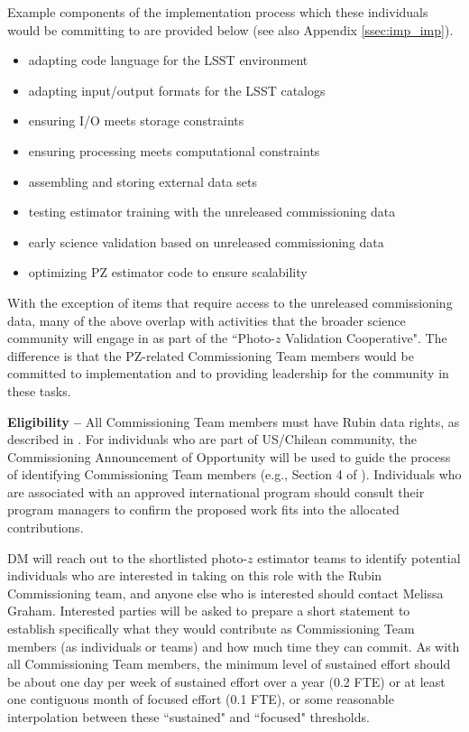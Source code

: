 \documentclass[DM,authoryear,toc]{lsstdoc}
\begin{document}
Example components of the implementation process which these individuals would be committing to are provided below (see also Appendix \ref{ssec:imp_imp}).

\begin{itemize}
\item adapting code language for the LSST environment
\item adapting input/output formats for the LSST catalogs
\item ensuring I/O meets storage constraints
\item ensuring processing meets computational constraints
\item assembling and storing external data sets
\item testing estimator training with the unreleased commissioning data
\item early science validation based on unreleased commissioning data
\item optimizing PZ estimator code to ensure scalability
\end{itemize}

With the exception of items that require access to the unreleased commissioning data, many of the above overlap with activities that the broader science community will engage in as part of the ``Photo-$z$ Validation Cooperative".
The difference is that the PZ-related Commissioning Team members would be committed to implementation and to providing leadership for the community in these tasks.

{\bf Eligibility --} All Commissioning Team members must have Rubin data rights, as described in \cite{RDO-013}.
For individuals who are part of US/Chilean community, the Commissioning Announcement of Opportunity will be used to guide the process of identifying Commissioning Team members (e.g., Section 4 of \cite{sitcomtn-010}).
Individuals who are associated with an approved international program should consult their program managers to confirm the proposed work fits into the allocated contributions.

DM will reach out to the shortlisted photo-$z$ estimator teams to identify potential individuals who are interested in taking on this role with the Rubin Commissioning team, and anyone else who is interested should contact Melissa Graham.
Interested parties will be asked to prepare a short statement to establish specifically what they would contribute as Commissioning Team members (as individuals or teams) and how much time they can commit.
As with all Commissioning Team members, the minimum level of sustained effort should be about one day per week of sustained effort over a year (0.2 FTE) or at least one contiguous month of focused effort (0.1 FTE), or some reasonable interpolation between these ``sustained" and ``focused" thresholds.
\end{document}
